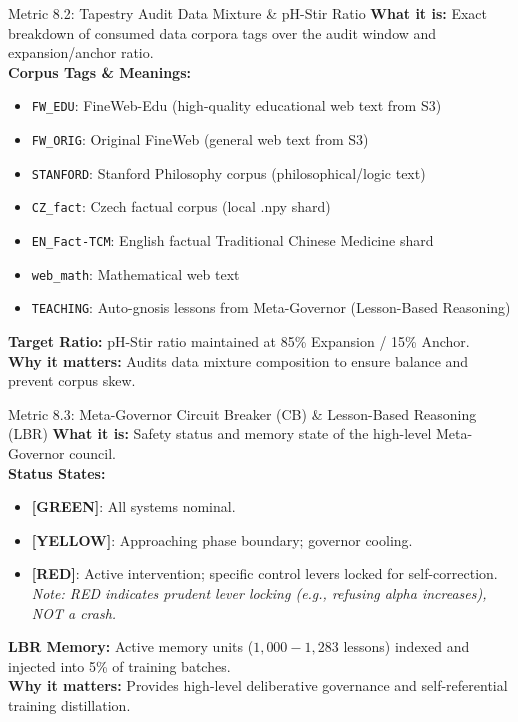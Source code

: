 \documentclass[11pt,a4paper]{article}
\begin{document}
\begin{metricbox}{Metric 8.2: Tapestry Audit Data Mixture \& pH-Stir Ratio}
\textbf{What it is:} Exact breakdown of consumed data corpora tags over the audit window and expansion/anchor ratio.\\
\textbf{Corpus Tags \& Meanings:}
\begin{itemize}[leftmargin=*]
    \item \texttt{FW\_EDU}: FineWeb-Edu (high-quality educational web text from S3)
    \item \texttt{FW\_ORIG}: Original FineWeb (general web text from S3)
    \item \texttt{STANFORD}: Stanford Philosophy corpus (philosophical/logic text)
    \item \texttt{CZ\_fact}: Czech factual corpus (local .npy shard)
    \item \texttt{EN\_Fact-TCM}: English factual Traditional Chinese Medicine shard
    \item \texttt{web\_math}: Mathematical web text
    \item \texttt{TEACHING}: Auto-gnosis lessons from Meta-Governor (Lesson-Based Reasoning)
\end{itemize}
\textbf{Target Ratio:} pH-Stir ratio maintained at 85\% Expansion / 15\% Anchor.\\
\textbf{Why it matters:} Audits data mixture composition to ensure balance and prevent corpus skew.
\end{metricbox}

\begin{metricbox}{Metric 8.3: Meta-Governor Circuit Breaker (CB) \& Lesson-Based Reasoning (LBR)}
\textbf{What it is:} Safety status and memory state of the high-level Meta-Governor council.\\
\textbf{Status States:}
\begin{itemize}[leftmargin=*]
    \item \textbf{[GREEN]}: All systems nominal.
    \item \textbf{[YELLOW]}: Approaching phase boundary; governor cooling.
    \item \textbf{[RED]}: Active intervention; specific control levers locked for self-correction. \emph{Note: RED indicates prudent lever locking (e.g., refusing alpha increases), NOT a crash.}
\end{itemize}
\textbf{LBR Memory:} Active memory units ($1,000 - 1,283$ lessons) indexed and injected into 5\% of training batches.\\
\textbf{Why it matters:} Provides high-level deliberative governance and self-referential training distillation.
\end{metricbox}
\end{document}

